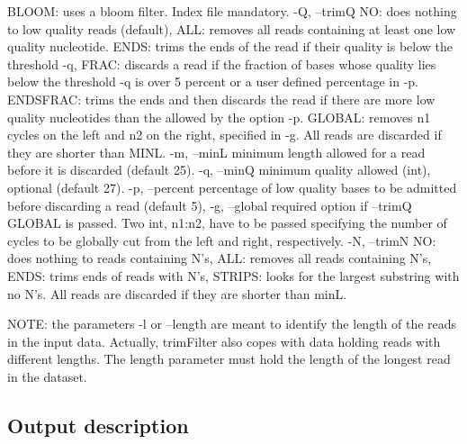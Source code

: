 \begin{DoxyCode}
               BLOOM: uses a bloom filter. Index file mandatory.
 -Q, --trimQ   NO:       does nothing to low quality reads (default),
               ALL:      removes all reads containing at least one low
                         quality nucleotide.
               ENDS:     trims the ends of the read if their quality is
                         below the threshold -q,
               FRAC:     discards a read if the fraction of bases whose
                         quality lies below
                         the threshold -q is over 5 percent or a user
                         defined percentage in -p.
               ENDSFRAC: trims the ends and then discards the read if
                         there are more low quality nucleotides than the
                         allowed by the option -p.
               GLOBAL:   removes n1 cycles on the left and n2 on the
                         right, specified in -g.
               All reads are discarded if they are shorter than MINL.
 -m, --minL    minimum length allowed for a read before it is discarded
               (default 25).
 -q, --minQ    minimum quality allowed (int), optional (default 27).
 -p, --percent percentage of low quality bases to be admitted before
               discarding a read (default 5),
 -g, --global  required option if --trimQ GLOBAL is passed. Two int,
               n1:n2, have to be passed specifying the number of cycles
               to be globally cut from the left and right, respectively.
 -N, --trimN   NO:     does nothing to reads containing N's,
               ALL:    removes all reads containing N's,
               ENDS:   trims ends of reads with N's,
               STRIPS: looks for the largest substring with no N's.
               All reads are discarded if they are shorter than minL.
\end{DoxyCode}


N\+O\+TE\+: the parameters -\/l or --length are meant to identify the length of the reads in the input data. Actually, {\ttfamily trim\+Filter} also copes with data holding reads with different lengths. The length parameter must hold the length of the longest read in the dataset.

\subsection*{Output description}


